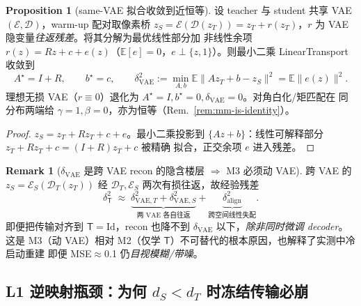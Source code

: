 \documentclass[11pt,a4paper]{article}
\newcommand{\E}{\mathbb{E}}
\newcommand{\Enc}{\mathcal{E}}
\newcommand{\Dec}{\mathcal{D}}
\newcommand{\Tmap}{\mathsf{T}}
\theoremstyle{definition}
\newtheorem{remark}{Remark}
\newtheorem{proposition}{Proposition}
\begin{document}
\begin{proposition}[same-VAE 拟合收敛到近恒等]
\label{prop:samevae-identity}
设 teacher 与 student 共享 VAE $(\Enc,\Dec)$，warm-up 配对取像素桥
$z_S=\Enc(\Dec(z_T))=z_T+r(z_T)$，$r$ 为 VAE 隐变量\emph{往返残差}。将其分解为最优线性部分加
非线性余项 $r(z)=Rz+c+e(z)$（$\E[e]=0$，$e\perp\{z,1\}$）。则最小二乘 LinearTransport 收敛到
\[
A^\star=I+R,\qquad b^\star=c,\qquad
\delta_{\mathrm{VAE}}^2:=\min_{A,b}\E\lVert Az_T+b-z_S\rVert^2=\E\lVert e(z)\rVert^2 .
\]
理想无损 VAE（$r\equiv0$）退化为 $A^\star=I,b^\star=0,\delta_{\mathrm{VAE}}=0$。对角白化/矩匹配在
同分布两端给 $\gamma{=}1,\beta{=}0$，亦为恒等（Rem.~\ref{rem:mm-is-identity}）。
\end{proposition}
\begin{proof}
$z_S=z_T+Rz_T+c+e$。最小二乘投影到 $\{Az+b\}$：线性可解释部分 $z_T+Rz_T+c=(I+R)z_T+c$ 被精确
拟合，正交余项 $e$ 进入残差。
\end{proof}

\begin{remark}[$\delta_{\mathrm{VAE}}$ 是跨 VAE recon 的隐含楼层 $\Rightarrow$ M3 必须动 VAE]
\label{rem:vae-floor}
跨 VAE 的 $z_S=\Enc_S(\Dec_T(z_T))$ 经 $\Dec_T,\Enc_S$ 两次有损往返，故经验残差
\[
\delta_{\Tmap}^2 \;\approx\; \underbrace{\delta_{\mathrm{VAE},T}^2+\delta_{\mathrm{VAE},S}^2}_{\text{两 VAE 各自往返}}+\underbrace{\delta_{\mathrm{align}}^2}_{\text{跨空间线性失配}} .
\]
即便把传输对齐到 $\Tmap=\mathrm{Id}$，recon 也降不到 $\delta_{\mathrm{VAE}}$ 以下，\emph{除非同时微调
decoder}。这是 M3（动 VAE）相对 M2（仅学 $\Tmap$）不可替代的根本原因，也解释了实测中冷启动重建
即便 MSE$\approx$0.1 仍\emph{目视模糊/带噪}。
\end{remark}

\subsection{L1 逆映射瓶颈：为何 $d_S<d_T$ 时冻结传输必崩}
\end{document}
